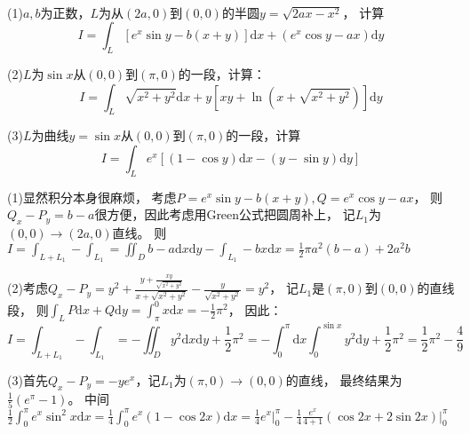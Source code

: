 ~

\begin{exercise}[Green公式基本应用]
  (1)$a,b$为正数，$L$为从$(2a,0)$到$(0,0)$的半圆$y = \sqrt{2ax - x^2}$，
  计算
  \begin{equation*}
    I = \int_L [e^x \sin y - b(x+y)]\mathrm{d} x + (e^x \cos y - ax)\mathrm{d} y
  \end{equation*}

  (2)$L$为$\sin x$从$(0,0)$到$(\pi,0)$的一段，计算：
  \begin{equation*}
    I = \int_L \sqrt{x^2 + y^2}\mathrm{d} x + y \left[ xy + \ln \left( x + \sqrt{x^2 + y^2} \right) \right]\mathrm{d} y
  \end{equation*}

  (3)$L$为曲线$y = \sin x$从$(0,0)$到$(\pi,0)$的一段，计算
  \begin{equation*}
    I = \int_L e^x \left[ (1 - \cos y) \mathrm{d} x - (y - \sin y)\mathrm{d} y \right]
  \end{equation*}
\end{exercise}

\begin{solution}
  (1)显然积分本身很麻烦，
  考虑$P = e^x \sin y - b(x+y), Q = e^x \cos y - ax$，
  则$Q_x - P_y = b-a$很方便，因此考虑用Green公式把圆周补上，
  记$L_1$为$(0,0) \rightarrow (2a,0)$直线。
  则$I = \int_{L + L_1} - \int_{L_1} = \iint_D b - a \mathrm{d} x \mathrm{d} y - \int_{L_1} -bx \mathrm{d} x =   \frac{1}{2}\pi a^2(b-a) + 2a^2b$

  (2)考虑$Q_x - P_y = y^2 + \frac{y + \frac{xy}{\sqrt{x^2 + y^2}}}{x + \sqrt{x^2 + y^2}} - \frac{y}{\sqrt{x^2 + y^2}} = y^2$，
  记$L_1$是$(\pi,0)$到$(0,0)$的直线段，
  则$\int_L P\mathrm{d} x + Q\mathrm{d} y = \int_{\pi}^0 x\mathrm{d} x = - \frac{1}{2}\pi^2$，
  因此：
  \begin{equation*}
    I = \int_{L+L_1} - \int_{L_1} = - \iint_D y^2\mathrm{d} x \mathrm{d} y + \frac{1}{2}\pi^2 = - \int_0^{\pi}\mathrm{d} x \int_0^{\sin x}y^2 \mathrm{d} y + \frac{1}{2}\pi^2 = \frac{1}{2}\pi^2 - \frac{4}{9}
  \end{equation*}

  (3)首先$Q_x - P_y = -ye^x$，记$L_1$为$(\pi,0) \rightarrow (0,0)$的直线，
  最终结果为$\frac{1}{5}(e^\pi - 1)$。
  中间$\frac{1}{2}\int_0^{\pi}e^x \sin ^2x \mathrm{d} x = \frac{1}{4}\int_0^{\pi}e^x (1 - \cos 2x)\mathrm{d} x = \frac{1}{4} e^x \bigg|_0^{\pi} - \frac{1}{4}\frac{e^x}{4+1}(\cos 2x + 2\sin 2x)\bigg|_0^{\pi}$
\end{solution}

